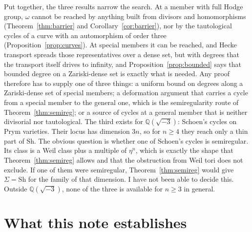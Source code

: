 \documentclass[11pt]{amsart}
\theoremstyle{definition}
\theoremstyle{remark}
\newcommand{\QQ}{\mathbb{Q}}
\newcommand{\Sh}{\mathrm{Sh}}
\begin{document}
Put together, the three results narrow the search. At a member with full
Hodge group, $\omega$ cannot be reached by anything built from divisors and
homomorphisms (Theorem~\ref{thm:barrier} and
Corollary~\ref{cor:barrier}), nor by the tautological cycles of a curve
with an automorphism of order three (Proposition~\ref{prop:curves}). At
special members it can be reached, and Hecke transport spreads those
representatives over a dense set, but with degrees that the transport
itself drives to infinity, and Proposition~\ref{prop:bounded} says that
bounded degree on a Zariski-dense set is exactly what is needed. Any proof
therefore has to supply one of three things: a uniform bound on degrees
along a Zariski-dense set of special members; a deformation argument that
carries a cycle from a special member to the general one, which is the
semiregularity route of Theorem~\ref{thm:semireg}; or a source of cycles at
a general member that is neither divisorial nor tautological. The third
exists for $\QQ(\sqrt{-3})$: Schoen's cycles on Prym varieties. Their
locus has dimension $3n$, so for $n\ge4$ they reach only a thin part of
$\Sh$. The obvious question is whether one of Schoen's cycles is
semiregular. Its class is a Weil class plus a multiple of $\eta^{n}$, which is
exactly the shape that Theorem~\ref{thm:semireg} allows and that the
obstruction from Weil tori does not exclude. If one of them were
semiregular, Theorem~\ref{thm:semireg} would give $\Sigma=\Sh$ for the
family of that dimension. I have not been able to decide this. Outside
$\QQ(\sqrt{-3})$, none of the three is available for $n\ge3$ in general.

\section{What this note establishes}
\end{document}
